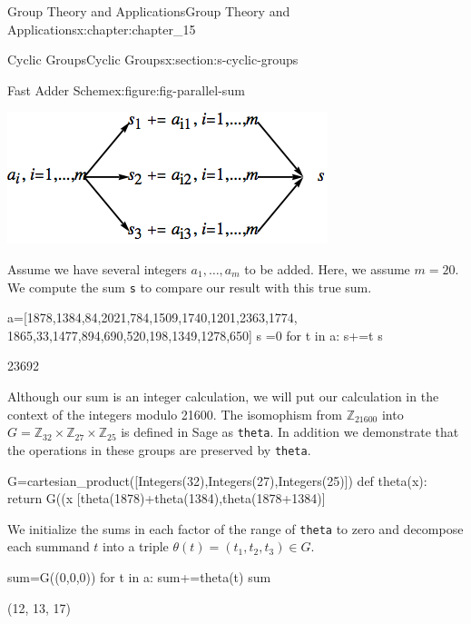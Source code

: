 \documentclass[twoside,10pt,]{book}
\newcommand{\mono}[1]{\texttt{#1}}
\numberwithin{equation}{section}
\begin{document}
\begin{chapterptx}{Group Theory and Applications}{}{Group Theory and Applications}{}{}{x:chapter:chapter_15}
\begin{sectionptx}{Cyclic Groups}{}{Cyclic Groups}{}{}{x:section:s-cyclic-groups}
\begin{figureptx}{Fast Adder Scheme}{x:figure:fig-parallel-sum}{}
\begin{image}{0.15}{0.7}{0.15}
\includegraphics[width=\linewidth]{images/fig-parallel-sum.png}
\end{image}%
\tcblower
\end{figureptx}%
Assume we have several integers \(a_1, \ldots , a_m\) to be added.  Here, we assume \(m= 20\). We compute the sum \mono{s} to compare our result with this true sum.%
\begin{sageinput}
a=[1878,1384,84,2021,784,1509,1740,1201,2363,1774,
   1865,33,1477,894,690,520,198,1349,1278,650]
s =0
for t in a:
    s+=t
s
\end{sageinput}
\begin{sageoutput}
23692
\end{sageoutput}
Although our sum is an integer calculation, we will put our calculation in the context of the integers modulo 21600.  The isomophism from \(\mathbb{Z}_{21600}\) into \(G=\mathbb{Z}_{32}\times \mathbb{Z}_{27}\times \mathbb{Z}_{25}\) is defined in Sage as \mono{theta}.   In addition we demonstrate that the operations in these groups are preserved by \mono{theta}.%
\begin{sageinput}
G=cartesian_product([Integers(32),Integers(27),Integers(25)])
def theta(x):
    return G((x%
[theta(1878)+theta(1384),theta(1878+1384)]
\end{sageinput}
\begin{sageoutput}
[(30, 22, 12), (30, 22, 12)]
\end{sageoutput}
We initialize the sums in each factor of the range of \mono{theta} to zero and decompose each summand \(t\) into a triple \(\theta(t)=\left(t_1,t_2,t_3\right)\in G\).%
\begin{sageinput}
sum=G((0,0,0))
for t in a:
    sum+=theta(t)
sum
\end{sageinput}
\begin{sageoutput}
(12, 13, 17)
\end{sageoutput}

\end{sectionptx}
\end{chapterptx}
\end{document}
